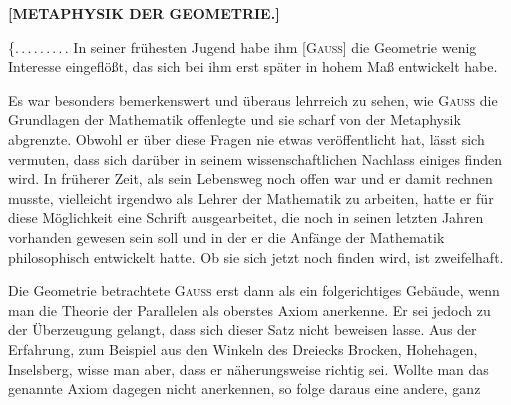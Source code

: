 \clearpage
{}%
\begin{center}
\textbf{[METAPHYSIK DER GEOMETRIE.]}

\end{center}

\{\mbox{.\,.\,.\,.\,.\,.\,.\,.\,.} In seiner frühesten Jugend habe ihm [\textsc{Gauss}] die Geometrie wenig Interesse eingeflößt, das sich bei ihm erst später in hohem Maß entwickelt habe.

Es war besonders bemerkenswert und überaus lehrreich zu sehen, wie \textsc{Gauss} die Grundlagen der Mathematik offenlegte und sie scharf von der Metaphysik abgrenzte. Obwohl er über diese Fragen nie etwas veröffentlicht hat, lässt sich vermuten, dass sich darüber in seinem wissenschaftlichen Nachlass einiges finden wird. In früherer Zeit, als sein Lebensweg noch offen war und er damit rechnen musste, vielleicht irgendwo als Lehrer der Mathematik zu arbeiten, hatte er für diese Möglichkeit eine Schrift ausgearbeitet, die noch in seinen letzten Jahren vorhanden gewesen sein soll und in der er die Anfänge der Mathematik philosophisch entwickelt hatte. Ob sie sich jetzt noch finden wird, ist zweifelhaft.

Die Geometrie betrachtete \textsc{Gauss} erst dann als ein folgerichtiges Gebäude, wenn man die Theorie der Parallelen als oberstes Axiom anerkenne. Er sei jedoch zu der Überzeugung gelangt, dass sich dieser Satz nicht beweisen lasse. Aus der Erfahrung, zum Beispiel aus den Winkeln des Dreiecks Brocken, Hohehagen, Inselsberg, wisse man aber, dass er näherungsweise richtig sei. Wollte man das genannte Axiom dagegen nicht anerkennen, so folge daraus eine andere, ganz\space%
